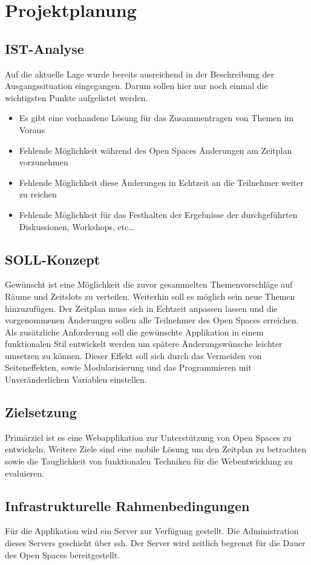 \section{Projektplanung}
\subsection{IST-Analyse}
Auf die aktuelle Lage wurde bereits ausreichend in der Beschreibung
der Ausgangssituation eingegangen. Darum sollen hier nur noch einmal
die wichtigsten Punkte aufgelistet werden.
\begin{itemize}
\item Es gibt eine vorhandene Lösung für das Zusammentragen von Themen
  im Voraus
\item Fehlende Möglichkeit während des Open Spaces Änderungen am
  Zeitplan vorzunehmen
\item Fehlende Möglichkeit diese Änderungen in Echtzeit an die
  Teilnehmer weiter zu reichen
\item Fehlende Möglichkeit für das Festhalten der Ergebnisse der
  durchgeführten Diskussionen, Workshops, etc\ldots
\end{itemize}
\subsection{SOLL-Konzept}
Gewünscht ist eine Möglichkeit die zuvor gesammelten Themenvorschläge
auf Räume und Zeitslots zu verteilen. Weiterhin soll es möglich sein
neue Themen hinzuzufügen. Der Zeitplan muss sich in Echtzeit anpassen
lassen und die vorgenommenen Änderungen sollen alle Teilnehmer des
Open Spaces erreichen. Als zusätzliche Anforderung soll die gewünschte
Applikation in einem funktionalen Stil entwickelt werden um spätere
Änderungswünsche leichter umsetzen zu können. Dieser Effekt soll sich
durch das Vermeiden von Seiteneffekten, sowie Modularisierung und das
Programmieren mit Unveränderlichen Variablen einstellen.
\subsection{Zielsetzung}
Primärziel ist es eine Webapplikation zur Unterstützung von Open
Spaces zu entwickeln. Weitere Ziele sind eine mobile Lösung um den
Zeitplan zu betrachten sowie die Tauglichkeit von funktionalen
Techniken für die Webentwicklung zu evaluieren.
\subsection{Infrastrukturelle Rahmenbedingungen}
Für die Applikation wird ein Server zur Verfügung gestellt. Die
Administration dieses Servers geschieht über \gls{ssh}. Der Server
wird zeitlich begrenzt für die Dauer des Open Spaces bereitgestellt.
